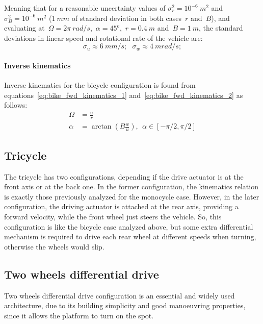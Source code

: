 Meaning that for a reasonable uncertainty values of $\sigma^2_r=10^{-6}\ m^2$ and $\sigma^2_B=10^{-6}\ m^2$ ($1\ mm$ of standard deviation in both cases~$r$ and~$B$), and evaluating at~$\Omega=2\pi\ rad/s$,~$\alpha=45^o$,~$r=0.4\ m$ and~$B=1\ m$, the standard deviations in linear speed and rotational rate of the vehicle are: 
\begin{equation}
 \sigma_u \approx 6\ mm/s ; \ \ \ \sigma_w \approx 4\ mrad/s ;
\end{equation}


\paragraph{Inverse kinematics}
Inverse kinematics for the bicycle configuration is found from equations~\ref{eq:bike_fwd_kinematics_1} and~\ref{eq:bike_fwd_kinematics_2} as follows: 
\begin{align}
 \Omega & = \frac{u}{r} \\
 \alpha & = \arctan(B\frac{w}{u}), \ \ \alpha \in [-\pi/2,\pi/2]
\end{align}


\subsection{Tricycle}
The tricycle has two configurations, depending if the drive actuator is at the front axis or at the back one. In the former configuration, the kinematics relation is exactly those previously analyzed for the monocycle case. However, in the later configuration, the driving actuator is attached at the rear axis, providing a forward velocity, while the front wheel just steers the vehicle. So, this configuration is like the bicycle case analyzed above, but some extra differential mechanism is required to drive each rear wheel at different speeds when turning, otherwise the wheels would slip. 


\subsection{Two wheels differential drive}
Two wheels differential drive configuration is an essential and widely used architecture, due to its building simplicity and good manoeuvring properties, since it allows the platform to turn on the spot. 

